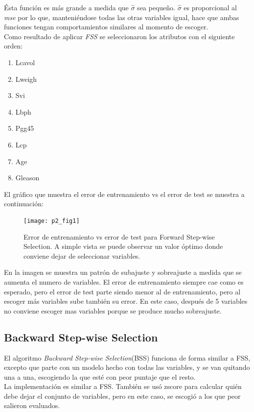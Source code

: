 \documentclass[letter, 10pt]{article}
\begin{document}
Ésta función es más grande a medida que $\hat{\sigma}$ sea pequeño. $\hat{\sigma}$
es proporcional al \textit{mse} por lo que, manteniéndose todas las otras
variables igual, hace que ambas funciones tengan comportamientos similares al
momento de escoger. \\

Como resultado de aplicar \textit{FSS} se seleccionaron los atributos con el
siguiente orden:
\begin{enumerate}
\item Lcavol 
\item Lweigh
\item Svi
\item Lbph
\item Pgg45
\item Lcp
\item Age
\item Gleason   
\end{enumerate}

El gráfico que muestra el error de entrenamiento vs el error de test se
muestra a continuación:

\begin{figure}[H]
  \centering
 \texttt{[image: p2\_fig1]} 
  \caption{Error de entrenamiento vs error de test para Forward Step-wise
    Selection. A simple vista se puede observar un valor óptimo donde conviene
    dejar de seleccionar variables. }
  \label{fig:p2_g1}
\end{figure}

En la imagen se muestra un patrón de subajuste y sobreajuste a medida que se
aumenta el numero de variables. El error de entrenamiento siempre cae como es
esperado, pero el error de test parte siendo menor al de entrenamiento, pero al
escoger más variables sube también su error. En este caso, después de 5
variables no conviene escoger mas variables porque se produce mucho sobreajuste.

\subsection{Backward Step-wise Selection}

El algoritmo \textit{Backward Step-wise Selection}(BSS) funciona de forma
similar a FSS, excepto que parte con un modelo hecho con todas las variables, y
se van quitando una a una, escogiendo la que esté con peor puntaje que el resto.\\

La implementación es similar a FSS. También se usó zscore para calcular quién
debe dejar el conjunto de variables, pero en este caso, se escogió a los que
peor salieron evaluados.\\
\end{document}
